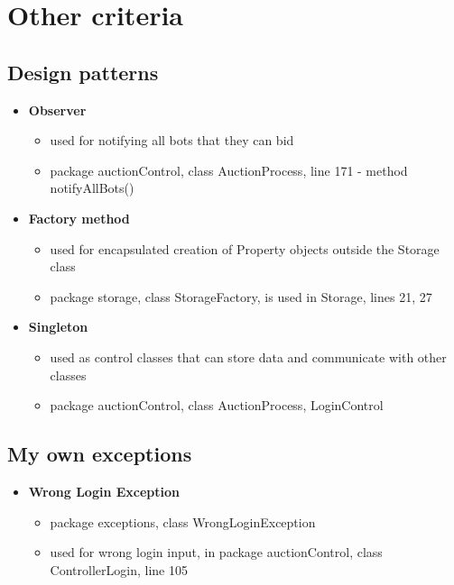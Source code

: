 \documentclass[
]{report}
\providecommand{\tightlist}{%
  \setlength{\itemsep}{0pt}\setlength{\parskip}{0pt}}
\begin{document}
\hypertarget{other-criteria}{%
\section{Other criteria}\label{other-criteria}}

\hypertarget{design-patterns}{%
\subsection{Design patterns}\label{design-patterns}}

\begin{itemize}
\tightlist
\item
  \textbf{Observer}

  \begin{itemize}
  \tightlist
  \item
    used for notifying all bots that they can bid
  \item
    package auctionControl, class AuctionProcess, line 171 - method notifyAllBots()
  \end{itemize}
\item
  \textbf{Factory method}

  \begin{itemize}
  \tightlist
  \item
    used for encapsulated creation of Property objects outside the Storage class
  \item
    package storage, class StorageFactory, is used in Storage, lines 21, 27
  \end{itemize}
\item
  \textbf{Singleton}

  \begin{itemize}
  \tightlist
  \item
    used as control classes that can store data and communicate with other classes
  \item
    package auctionControl, class AuctionProcess, LoginControl
  \end{itemize}
\end{itemize}

\hypertarget{my-own-exceptions}{%
\subsection{My own exceptions}\label{my-own-exceptions}}

\begin{itemize}
\tightlist
\item
  \textbf{Wrong Login Exception}

  \begin{itemize}
  \tightlist
  \item
    package exceptions, class WrongLoginException
  \item
    used for wrong login input, in package auctionControl, class ControllerLogin, line 105
  \end{itemize}
\end{itemize}
\end{document}
